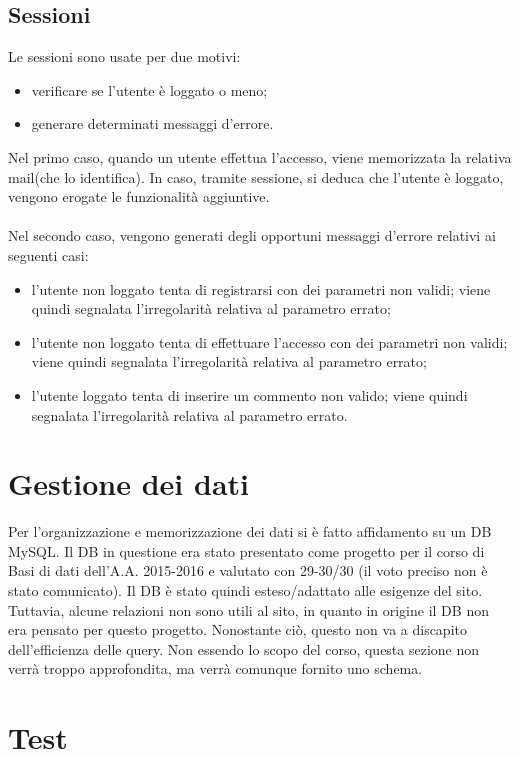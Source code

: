  \subsection{Sessioni}
 Le sessioni sono usate per due motivi:
 \begin{itemize}
 	\item verificare se l'utente è loggato o meno;
 	\item generare determinati messaggi d'errore.
 \end{itemize}
 Nel primo caso, quando un utente effettua l'accesso, viene memorizzata la relativa mail(che lo identifica). In caso, tramite sessione, si deduca che l'utente è loggato, vengono erogate le funzionalità aggiuntive. \\ \\
 Nel secondo caso, vengono generati degli opportuni messaggi d'errore relativi ai seguenti casi:
 \begin{itemize}
 	\item l'utente non loggato tenta di registrarsi con dei parametri non validi; viene quindi segnalata l'irregolarità relativa al parametro errato;
 	\item l'utente non loggato tenta di effettuare l'accesso con dei parametri non validi; viene quindi segnalata l'irregolarità relativa al parametro errato;
 	\item l'utente loggato tenta di inserire un commento non valido; viene quindi segnalata l'irregolarità relativa al parametro errato.
 \end{itemize}

\section{Gestione dei dati}
Per l'organizzazione e memorizzazione dei dati si è fatto affidamento su un DB MySQL. Il DB in questione era stato presentato come progetto per il corso di Basi di dati dell'A.A. 2015-2016 e valutato con 29-30/30 (il voto preciso non è stato comunicato). Il DB è stato quindi esteso/adattato alle esigenze del sito. Tuttavia, alcune relazioni non sono utili al sito, in quanto in origine il DB non era pensato per questo progetto. Nonostante ciò, questo non va a discapito dell'efficienza delle query. Non essendo lo scopo del corso, questa sezione non verrà troppo approfondita, ma verrà comunque fornito uno schema.

\section{Test}


